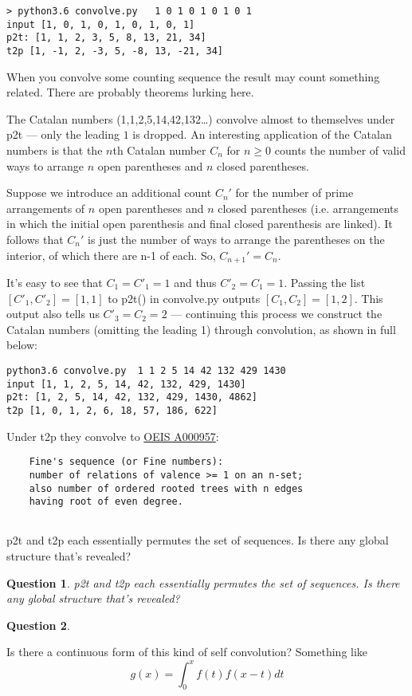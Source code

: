 \documentclass[10pt]{article}
\newtheorem{question}{Question}
\numberwithin{equation}{section}
\begin{document}
\begin{verbatim}
> python3.6 convolve.py   1 0 1 0 1 0 1 0 1
input [1, 0, 1, 0, 1, 0, 1, 0, 1]
p2t: [1, 1, 2, 3, 5, 8, 13, 21, 34]
t2p [1, -1, 2, -3, 5, -8, 13, -21, 34]
\end{verbatim}

When you convolve some counting sequence the result may count something related. There are probably theorems lurking here.

The Catalan numbers (1,1,2,5,14,42,132\ldots) convolve almost to themselves under p2t --- only the leading $1$ is dropped. An interesting application of the Catalan numbers is that the $n$th Catalan number $C_n$ for $n\geq 0$ counts the number of valid ways to arrange $n$ open parentheses and $n$ closed parentheses.

Suppose we introduce an additional count $C_n'$ for the number of prime arrangements of $n$ open parentheses and $n$ closed parentheses (i.e. arrangements in which the initial open parenthesis and final closed parenthesis are linked). It follows that $C_n'$ is just the number of ways to arrange the parentheses on the interior, of which there are n-1 of each. So, $C_{n+1}'=C_n$.

It's easy to see that $C_1=C'_1=1$ and thus $C'_2=C_1=1.$ Passing the list $[C'_1, C'_2]=[1,1]$ to p2t() in convolve.py outputs $[C_1, C_2]=[1,2]$. This output also tells us $C'_3=C_2=2$ — continuing this process we construct the Catalan numbers (omitting the leading 1) through convolution, as shown in full below:

\begin{verbatim}
python3.6 convolve.py  1 1 2 5 14 42 132 429 1430
input [1, 1, 2, 5, 14, 42, 132, 429, 1430]
p2t: [1, 2, 5, 14, 42, 132, 429, 1430, 4862]
t2p [1, 0, 1, 2, 6, 18, 57, 186, 622]
\end{verbatim}
 Under t2p they convolve to 
\href{https://oeis.org/A000957}{OEIS A000957}:
\begin{verbatim}
	Fine's sequence (or Fine numbers):
	number of relations of valence >= 1 on an n-set;
	also number of ordered rooted trees with n edges 
	having root of even degree. 
	
\end{verbatim}
p2t and t2p each essentially permutes the set of sequences. Is there any global structure that's revealed?

\begin{question}

p2t  and  t2p  each  essentially  permutes  the  set  of  sequences.   Is  there  any global structure that’s revealed?
\end{question}
\begin{question}

\end{question}
Is there a continuous form of this kind of self convolution? Something like
\begin{equation*}
    g(x) = \int_0^x f(t)f(x-t)dt
\end{equation*}
\end{document}
